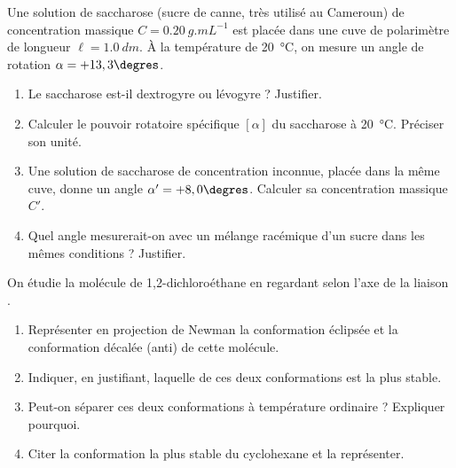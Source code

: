 \documentclass[11pt]{article}
\newcounter{popsec}
\newcounter{popsub}
\newcommand{\courssub}[1]{%
  \stepcounter{popsub}%
  \par\vspace{9pt}\noindent{\popxbold\fontsize{11.5}{13}\selectfont\color{popink}{\color{poporange}\thepopsec.\thepopsub}\hspace{6pt}#1}\par\nopagebreak\vspace{4pt}
}
\begin{document}
\begin{exercice}
Une solution de saccharose (sucre de canne, très utilisé au Cameroun) de concentration massique $C = \SI{0,20}{g.mL^{-1}}$ est placée dans une cuve de polarimètre de longueur $\ell = \SI{1,0}{dm}$. À la température de \SI{20}{\celsius}, on mesure un angle de rotation $\alpha = +13,3\degres$.
\begin{enumerate}
\item Le saccharose est-il dextrogyre ou lévogyre ? Justifier.
\item Calculer le pouvoir rotatoire spécifique $[\alpha]$ du saccharose à \SI{20}{\celsius}. Préciser son unité.
\item Une solution de saccharose de concentration inconnue, placée dans la même cuve, donne un angle $\alpha' = +8,0\degres$. Calculer sa concentration massique $C'$.
\item Quel angle mesurerait-on avec un mélange racémique d'un sucre dans les mêmes conditions ? Justifier.
\end{enumerate}
\end{exercice}

\begin{exercice}
On étudie la molécule de 1,2-dichloroéthane  en regardant selon l'axe de la liaison .
\begin{enumerate}
\item Représenter en projection de Newman la conformation éclipsée et la conformation décalée (anti) de cette molécule.
\item Indiquer, en justifiant, laquelle de ces deux conformations est la plus stable.
\item Peut-on séparer ces deux conformations à température ordinaire ? Expliquer pourquoi.
\item Citer la conformation la plus stable du cyclohexane et la représenter.
\end{enumerate}
\end{exercice}

\courssub{Je me prépare au Bac}
\end{document}
